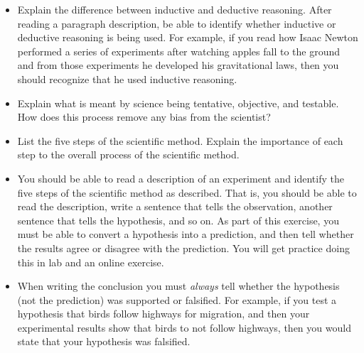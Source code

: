 \documentclass[letterpaper]{tufte-handout}
\begin{document}
\begin{itemize}

	\item Explain the difference between inductive and deductive reasoning. After reading a paragraph description, be able to identify whether inductive or deductive reasoning is being used. For example, if you read how Isaac Newton performed a series of experiments after watching apples fall to the ground and from those experiments he developed his gravitational laws, then you should recognize that he used inductive reasoning.
	
	\item Explain what is meant by science being tentative, objective, and testable. How does this process remove any bias from the scientist?
	
	\item List the five steps of the scientific method. Explain the importance of each step to the overall process of the scientific method.
	
	\item You should be able to read a description  of an experiment and identify the five steps of the scientific method as described. That is, you should be able to read the description, write a sentence that tells the observation, another sentence that tells the hypothesis, and so on.  As part of this exercise, you must be able to convert a hypothesis into a prediction, and then tell whether the results agree or disagree with the prediction.  You will get practice doing this in lab and an online exercise.
	
	\item When writing the conclusion you must \emph{always} tell whether the hypothesis (not the prediction) was supported or falsified. For example, if you test a hypothesis that birds follow highways for migration, and then your experimental results show that birds to not follow highways, then you would state that your hypothesis was falsified.

\end{itemize}
\end{document}
